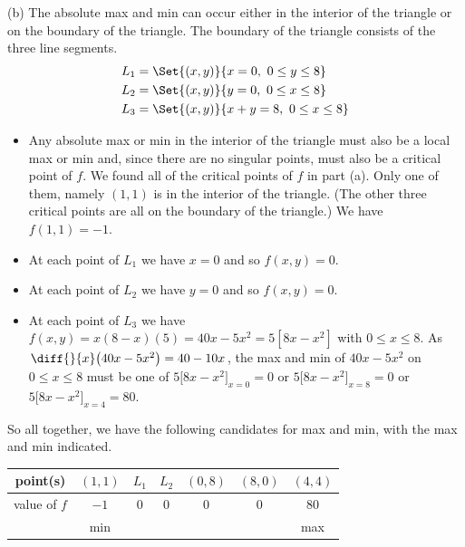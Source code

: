 \begin{solution}
(b) The absolute max and min can occur either in the interior
    of the triangle or on the boundary of the triangle. The boundary
    of the triangle consists of the three line segments.
\begin{align*}
       L_1 &= \Set{(x,y)}{x=0,\ 0\le y\le 8} \\
       L_2 &= \Set{(x,y)}{y=0,\ 0\le x\le 8} \\
       L_3 &= \Set{(x,y)}{x+y=8,\ 0\le x\le 8} 
\end{align*}
\begin{itemize}
\item Any absolute max or min in the interior of the triangle
      must also be a local max or min and, since there are no
      singular points, must also be a critical point of $f$.
      We found all of the critical points of $f$ in part (a).
      Only one of them, namely $(1,1)$ is in the interior of the
      triangle. (The other three critical points are all on the
      boundary of the triangle.) We have $f(1,1) = -1$.
\item At each point of $L_1$ we have $x=0$ and so $f(x,y)=0$.
\item At each point of $L_2$ we have $y=0$ and so $f(x,y)=0$.
\item At each point of $L_3$ we have 
           $f(x,y)=x(8-x)(5)=40x-5x^2=5[8x-x^2]$ 
           with $0\le x\le 8$. As 
          $\diff{}{x}\big(40x-5x^2\big)= 40-10x$, the max and min of
         $40x-5x^2$ on $0\le x\le 8$ must be one of
         $5\big[8x-x^2\big]_{x=0}=0$ or
         $5\big[8x-x^2\big]_{x=8}=0$ or
         $5\big[8x-x^2\big]_{x=4}=80$. 
\end{itemize}
So all together, we have the following candidates for max and min, with the
max and min indicated.
\begin{center}
\renewcommand{\arraystretch}{1.3}
     \begin{tabular}{|c|c|c|c|c|c|c|}
     \hline
       point(s)
       &$(1,1)$
       &$L_1$
       &$L_2$
       &$(0,8)$ 
       &$(8,0)$ 
       &$(4,4)$ \\ \hline
       value of $f$
       &$-1$
       &$0$
       &$0$
       &$0$ 
       &$0$ 
       &$80$ \\ \hline
       &min
       & 
       & 
       & 
       & 
       & max\\ \hline
     \end{tabular}
\renewcommand{\arraystretch}{1.0}
\qquad
{}
\end{center}
\end{solution}

